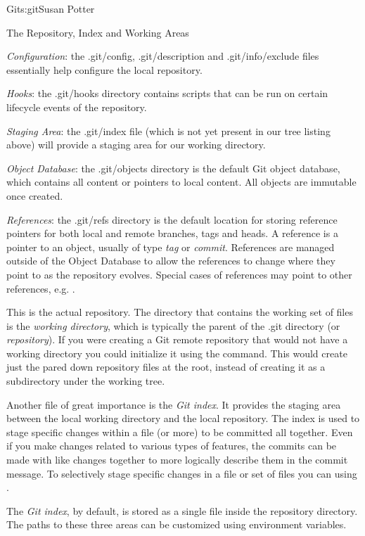 \begin{aosachapter}{Git}{s:git}{Susan Potter}
\begin{aosasect1}{The Repository, Index and Working Areas}
\begin{aosaitemize}
  \item \emph{Configuration}: the .git/config, .git/description and
  .git/info/exclude files essentially help configure the local repository.
  \item \emph{Hooks}: the .git/hooks directory contains scripts that can
  be run on certain lifecycle events of the repository.
  \item \emph{Staging Area}: the .git/index file (which is not yet
  present in our tree listing above) will provide a staging area for our
  working directory.
  \item \emph{Object Database}: the .git/objects directory is the default
  Git object database, which contains all content or pointers to local
  content. All objects are immutable once created.
  \item \emph{References}: the .git/refs directory is the default location
  for storing reference pointers for both local and remote branches, tags and
  heads. A reference is a pointer to an object, usually of type \emph{tag} or
  \emph{commit}. References are managed outside of the Object Database to
  allow the references to change where they point to as the repository
  evolves. Special cases of references may point to other references, e.g.
  .
\end{aosaitemize}

This is the actual repository. The directory that contains the working set
of files is the \emph{working directory}, which is typically the parent of
the .git directory (or \emph{repository}). If you were creating a Git
remote repository that would not have a working directory you could
initialize it using the  command. This would create
just the pared down repository files at the root, instead of creating it
as a subdirectory under the working tree.

Another file of great importance is the \emph{Git index}. It provides the
staging area between the local working directory and the local repository.
The index is used to stage specific changes within a file (or more) to
be committed all together. Even if you make changes related to various types
of features, the commits can be made with like changes together to more
logically describe them in the commit message. To selectively stage
specific changes in a file or set of files you can using .

The \emph{Git index}, by default, is stored as a single file inside the
repository directory. The paths to these three areas can be customized
using environment variables.


\end{aosasect1}
\end{aosachapter}
